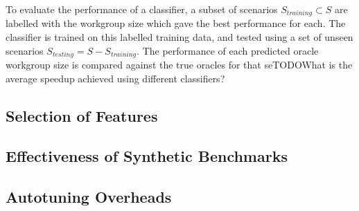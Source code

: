 To evaluate the performance of a classifier, a subset of scenarios
$S_{training} \subset S$ are labelled with the workgroup size which
gave the best performance for each. The classifier is trained on this
labelled training data, and tested using a set of unseen scenarios
$S_{testing} = S - S_{training}$. The performance of each predicted
oracle workgroup size is compared against the true oracles for that
seTODO{What is the average speedup achieved using different
  classifiers?}







\subsection{Selection of Features}



\subsection{Effectiveness of Synthetic Benchmarks}




\subsection{Autotuning Overheads}

